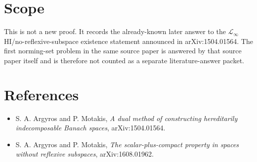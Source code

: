\documentclass[11pt]{article}
\begin{document}
\section*{Scope}

This is not a new proof. It records the already-known later answer to the
$\mathcal L_\infty$ HI/no-reflexive-subspace existence statement announced in
arXiv:1504.01564. The first norming-set problem in the same source paper is
answered by that source paper itself and is therefore not counted as a separate
literature-answer packet.

\section*{References}

\begin{itemize}
\item S. A. Argyros and P. Motakis, \emph{A dual method of constructing
hereditarily indecomposable Banach spaces}, arXiv:1504.01564.
\item S. A. Argyros and P. Motakis, \emph{The scalar-plus-compact property in
spaces without reflexive subspaces}, arXiv:1608.01962.
\end{itemize}
\end{document}
